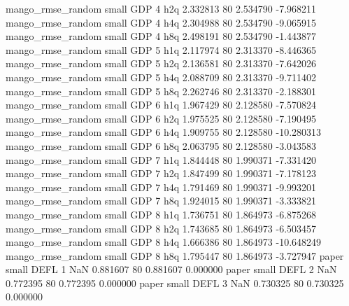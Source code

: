 mango_rmse_random      small      GDP                 4                  h2q 2.332813 80       2.534790          -7.968211
mango_rmse_random      small      GDP                 4                  h4q 2.304988 80       2.534790          -9.065915
mango_rmse_random      small      GDP                 4                  h8q 2.498191 80       2.534790          -1.443877
mango_rmse_random      small      GDP                 5                  h1q 2.117974 80       2.313370          -8.446365
mango_rmse_random      small      GDP                 5                  h2q 2.136581 80       2.313370          -7.642026
mango_rmse_random      small      GDP                 5                  h4q 2.088709 80       2.313370          -9.711402
mango_rmse_random      small      GDP                 5                  h8q 2.262746 80       2.313370          -2.188301
mango_rmse_random      small      GDP                 6                  h1q 1.967429 80       2.128580          -7.570824
mango_rmse_random      small      GDP                 6                  h2q 1.975525 80       2.128580          -7.190495
mango_rmse_random      small      GDP                 6                  h4q 1.909755 80       2.128580         -10.280313
mango_rmse_random      small      GDP                 6                  h8q 2.063795 80       2.128580          -3.043583
mango_rmse_random      small      GDP                 7                  h1q 1.844448 80       1.990371          -7.331420
mango_rmse_random      small      GDP                 7                  h2q 1.847499 80       1.990371          -7.178123
mango_rmse_random      small      GDP                 7                  h4q 1.791469 80       1.990371          -9.993201
mango_rmse_random      small      GDP                 7                  h8q 1.924015 80       1.990371          -3.333821
mango_rmse_random      small      GDP                 8                  h1q 1.736751 80       1.864973          -6.875268
mango_rmse_random      small      GDP                 8                  h2q 1.743685 80       1.864973          -6.503457
mango_rmse_random      small      GDP                 8                  h4q 1.666386 80       1.864973         -10.648249
mango_rmse_random      small      GDP                 8                  h8q 1.795447 80       1.864973          -3.727947
            paper      small     DEFL                 1                  NaN 0.881607 80       0.881607           0.000000
            paper      small     DEFL                 2                  NaN 0.772395 80       0.772395           0.000000
            paper      small     DEFL                 3                  NaN 0.730325 80       0.730325           0.000000
